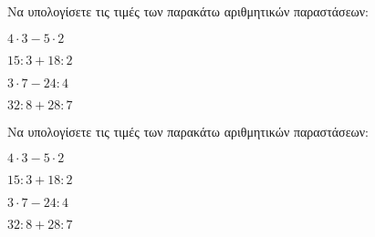 Να υπολογίσετε τις τιμές των παρακάτω αριθμητικών παραστάσεων:
\begin{alist}
\item $ 4\cdot 3-5\cdot 2 $
\item $ 15:3+18:2 $
\item $ 3\cdot 7-24:4 $
\item $ 32:8+28:7 $
\end{alist}
Να υπολογίσετε τις τιμές των παρακάτω αριθμητικών παραστάσεων:
\begin{alist}
\item $ 4\cdot 3-5\cdot 2 $
\item $ 15:3+18:2 $
\item $ 3\cdot 7-24:4 $
\item $ 32:8+28:7 $
\end{alist}
